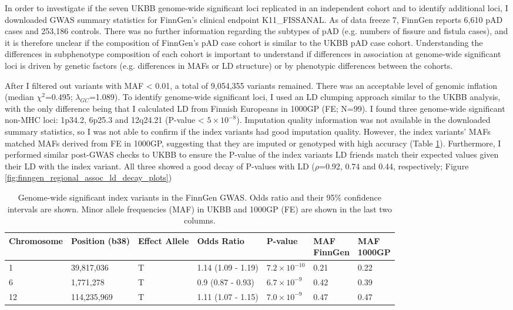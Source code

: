In order to investigate if the seven UKBB genome-wide significant loci replicated in an independent cohort and to identify additional loci, I downloaded GWAS summary statistics for FinnGen's clinical endpoint K11\_FISSANAL. As of data freeze 7, FinnGen reports 6,610 pAD cases and 253,186 controls. There was no further information regarding the subtypes of pAD (e.g. numbers of fissure and fistula cases), and it is therefore unclear if the composition of FinnGen's pAD case cohort is similar to the UKBB pAD case cohort. Understanding the differences in subphenotype composition of each cohort is important to understand if differences in association at genome-wide significant loci is driven by genetic factors (e.g. differences in MAFs or LD structure) or by phenotypic differences between the cohorts. 

After I filtered out variants with MAF < 0.01, a total of 9,054,355 variants remained. There was an acceptable level of genomic inflation (median $\chi^{2}$=0.495; $\lambda_{GC}$=1.089). To identify genome-wide significant loci, I used an LD clumping approach similar to the UKBB analysis, with the only difference being that I calculated LD from Finnish Europeans in 1000GP (FE; N=99). I found three genome-wide significant non-MHC loci: 1p34.2, 6p25.3 and 12q24.21 (P-value < $5\times10^{-8}$). Imputation quality information was not available in the downloaded summary statistics, so I was not able to confirm if the index variants had good imputation quality. However, the index variants' MAFs matched MAFs derived from FE in 1000GP, suggesting that they are imputed or genotyped with high accuracy (Table \ref{table:gws_finngen}). Furthermore, I performed similar post-GWAS checks to UKBB to ensure the P-value of the index variants LD friends match their expected values given their LD with the index variant. All three showed a good decay of P-values with LD ($\rho$=0.92, 0.74 and 0.44, respectively; Figure \ref{fig:finngen_regional_assoc_ld_decay_plots})

\begin{table}[htb]
  \centering\begingroup\fontsize{10}{12}\selectfont
  \caption[pAD-associated variants from the downloaded FinnGen GWAS summary statistics]{Genome-wide significant index variants in the FinnGen GWAS. Odds ratio and their 95\% confidence intervals are shown. Minor allele frequencies (MAF) in UKBB and 1000GP (FE) are shown in the last two columns.}
  \label{table:gws_finngen}
  \begin{tabular}[t]{|l|l|l|l|l|l|l|}
  \hline
  Chromosome & Position (b38) & Effect Allele & Odds Ratio & P-value & \makecell{MAF\\ FinnGen} & \makecell{MAF\\ 1000GP}\\
  \hline
  1 & 39,817,036 & T & 1.14 (1.09 - 1.19) & $7.2\times10^{-10}$ & 0.21 & 0.22\\
  \hline
  6 & 1,771,278 & T & 0.9 (0.87 - 0.93) & $6.7\times10^{-9}$ & 0.42 & 0.39\\
  \hline
  12 & 114,235,969 & T & 1.11 (1.07 - 1.15) & $7.0\times10^{-9}$ & 0.47 & 0.47\\
  \hline
  \end{tabular}
  \endgroup{}
  \end{table}


